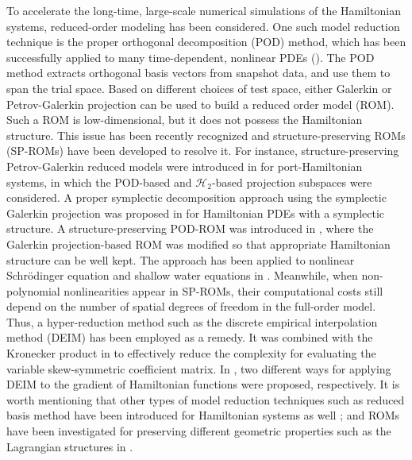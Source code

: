 \documentclass[11pt]{article}
\begin{document}
To accelerate the long-time, large-scale numerical simulations of the Hamiltonian systems, reduced-order modeling has been considered. 
One such model reduction technique is the proper orthogonal decomposition (POD) method, which has been successfully applied to many time-dependent, nonlinear PDEs (\cite{bui2007goal,carlberg2011low,chaturantabut2010nonlinear,daescu2008dual,HLB96,iollo2000stability,KV01,sirisup2004spectral,lassila2014model}).
The POD method extracts orthogonal basis vectors from snapshot data, and use them to span the trial space. 
Based on different choices of test space, either Galerkin or Petrov-Galerkin projection can be used to build a reduced order model (ROM). Such a ROM is low-dimensional, but it does not possess the Hamiltonian structure. 
This issue has been recently recognized and structure-preserving ROMs (SP-ROMs) have been developed to resolve it. 
For instance, structure-preserving Petrov-Galerkin reduced models were introduced in \cite{beattie2011structure,chaturantabut2016structure} for port-Hamiltonian systems, in which the POD-based and $\mathcal{H}_2$-based projection subspaces were considered. 
A proper symplectic decomposition approach using the symplectic Galerkin projection was proposed in \cite{peng2016symplectic} for Hamiltonian PDEs with a symplectic structure. 
A structure-preserving POD-ROM was introduced in \cite{gong2017structure}, where the Galerkin projection-based ROM was modified so that appropriate Hamiltonian structure can be well kept. The approach has been applied to nonlinear Schr\"{o}dinger equation and shallow water equations in \cite{karasozen2018energy,karasozen2021structure,sockwell2019mass}. 
Meanwhile, when non-polynomial nonlinearities appear in SP-ROMs, their computational costs still depend on the number of spatial degrees of freedom in the full-order model. 
Thus, a hyper-reduction method such as the discrete empirical interpolation method (DEIM) \cite{chaturantabut2012state} has been employed as a remedy. 
It was combined with the Kronecker product in \cite{miyatake2019structure} to effectively reduce the complexity for evaluating the variable skew-symmetric coefficient matrix. In \cite{chaturantabut2016structure,karasozen2018energy}, two different ways for applying DEIM to the gradient of Hamiltonian functions were proposed, respectively. 
It is worth mentioning that other types of model reduction techniques such as reduced basis method have been introduced for Hamiltonian systems as well \cite{afkham2017structure,afkham2019structure,hesthaven2020rank,pagliantini2020dynamical}; and ROMs have been investigated for preserving different geometric properties such as the Lagrangian structures in \cite{carlberg2015preserving,farhat2015structure}.
\end{document}
